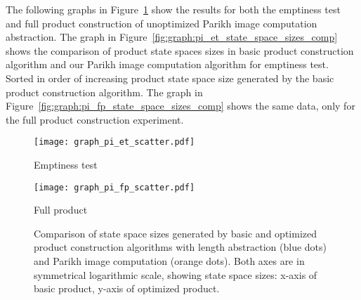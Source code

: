 The following graphs in Figure~\ref{fig:graph:pi_product_state_space_sizes} show the results for both the emptiness test and full product construction of unoptimized Parikh image computation abstraction. The graph in Figure~\ref{fig:graph:pi_et_state_space_sizes_comp} shows the comparison of product state spaces sizes in basic product construction algorithm and our Parikh image computation algorithm for emptiness test. Sorted in order of increasing product state space size generated by the basic product construction algorithm. The graph in Figure~\ref{fig:graph:pi_fp_state_space_sizes_comp} shows the same data, only for the full product construction experiment.


\begin{figure}[ht]
    \centering
    \begin{minipage}{0.49\linewidth}
        \centering
        \texttt{[image: graph\_pi\_et\_scatter.pdf]}
        \caption{Emptiness test}
        \label{fig:graph:pi_et_state_space_sizes_comp}
    \end{minipage}
    \hfill
    \begin{minipage}{0.49\linewidth}
        \centering
        \texttt{[image: graph\_pi\_fp\_scatter.pdf]}
        \caption{Full product}
        \label{fig:graph:pi_fp_state_space_sizes_comp}
    \end{minipage}
    \vspace{0.5cm}

    \caption{Comparison of state space sizes generated by basic and optimized product construction algorithms with length abstraction (blue dots) and Parikh image computation (orange dots). Both axes are in symmetrical logarithmic scale\protect\footnotemark, showing state space sizes: x-axis of basic product, y-axis of optimized product.}
    \label{fig:graph:pi_product_state_space_sizes}
\end{figure}

